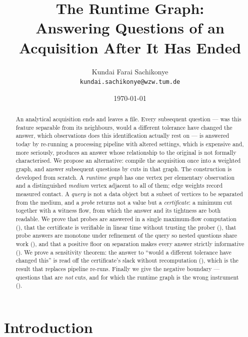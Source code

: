 \documentclass[11pt,a4paper]{article}
\title{\textbf{The Runtime Graph:\\[2pt]
Answering Questions of an Acquisition After It Has Ended}}
\author{Kundai Farai Sachikonye\\
\texttt{kundai.sachikonye@wzw.tum.de}}
\date{\today}
\theoremstyle{definition}
\theoremstyle{remark}
\begin{document}
\maketitle

\begin{abstract}
\noindent
An analytical acquisition ends and leaves a file. Every subsequent
question --- was this feature separable from its neighbours, would a
different tolerance have changed the answer, which observations does this
identification actually rest on --- is answered today by re-running a
processing pipeline with altered settings, which is expensive and, more
seriously, produces an answer whose relationship to the original is not
formally characterised. We propose an alternative: compile the
acquisition once into a weighted graph, and answer subsequent questions
by cuts in that graph. The construction is developed from scratch. A
\emph{runtime graph} has one vertex per elementary observation and a
distinguished \emph{medium} vertex adjacent to all of them; edge weights
record measured contact. A \emph{query} is not a data object but a subset
of vertices to be separated from the medium, and a \emph{probe} returns
not a value but a \emph{certificate}: a minimum cut together with a
witness flow, from which the answer and its tightness are both readable.
We prove that probes are answered in a single maximum-flow computation
(), that the certificate is verifiable in linear
time without trusting the prober (), that probe answers
are monotone under refinement of the query so nested questions share work
(), and that a positive floor on separation makes
every answer strictly informative (). We prove a
sensitivity theorem: the answer to ``would a different tolerance have
changed this'' is read off the certificate's slack without recomputation
(), which is the result that replaces pipeline
re-runs. Finally we give the negative boundary --- questions that are
\emph{not} cuts, and for which the runtime graph is the wrong instrument
().
\end{abstract}

\section{Introduction}
\label{sec:intro}
\end{document}
